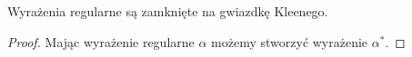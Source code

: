 \begin{theorem}
	Wyrażenia regularne są zamknięte na gwiazdkę Kleenego.
\end{theorem}

\begin{proof}
	Mając wyrażenie regularne \(\alpha\) możemy stworzyć wyrażenie \(\alpha^*\).
\end{proof}